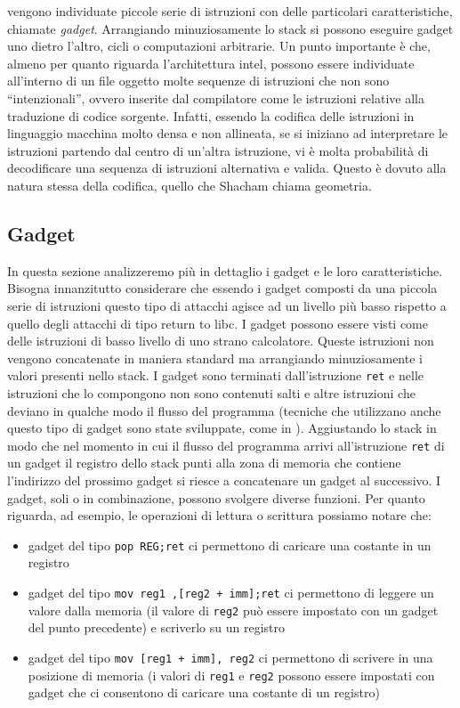 vengono individuate piccole serie di istruzioni con delle particolari
caratteristiche, chiamate \emph{gadget}. Arrangiando minuziosamente lo
stack si possono eseguire gadget uno dietro l'altro, cicli o
computazioni arbitrarie. Un punto importante è che, almeno per quanto
riguarda l'architettura intel, possono essere individuate all'interno
di un file oggetto molte sequenze di istruzioni che non sono
``intenzionali'', ovvero inserite dal compilatore come le istruzioni
relative alla traduzione di codice sorgente. Infatti, essendo la
codifica delle istruzioni in linguaggio macchina molto densa e non
allineata, se si iniziano ad interpretare le istruzioni partendo dal
centro di un'altra istruzione, vi è molta probabilità di decodificare
una sequenza di istruzioni alternativa e valida. Questo è dovuto alla
natura stessa della codifica, quello che Shacham chiama geometria.

\subsection{Gadget}

In questa sezione analizzeremo più in dettaglio i gadget e le loro
caratteristiche. Bisogna innanzitutto considerare che essendo i gadget
composti da una piccola serie di istruzioni questo tipo di attacchi
agisce ad un livello più basso rispetto a quello degli attacchi di
tipo return to libc. I gadget possono essere visti come delle
istruzioni di basso livello di uno strano calcolatore. Queste
istruzioni non vengono concatenate in maniera standard ma arrangiando
minuziosamente i valori presenti nello stack. I gadget sono terminati
dall'istruzione \lstinline{ret} e nelle istruzioni che lo compongono
non sono contenuti salti e altre istruzioni che deviano in qualche
modo il flusso del programma (tecniche che utilizzano anche questo
tipo di gadget sono state sviluppate, come in
\cite{Checkoway-10}). Aggiustando lo stack in modo che nel momento in
cui il flusso del programma arrivi all'istruzione \lstinline{ret} di
un gadget il registro dello stack punti alla zona di memoria che
contiene l'indirizzo del prossimo gadget si riesce a concatenare un
gadget al successivo. I gadget, soli o in combinazione, possono
svolgere diverse funzioni. Per quanto riguarda, ad esempio, le
operazioni di lettura o scrittura possiamo notare che:

\begin{itemize}
\item gadget del tipo \lstinline{pop REG;ret} ci permettono di
caricare una costante in un registro

\item gadget del tipo \lstinline{mov reg1 ,[reg2 + imm];ret} ci
  permettono di leggere un valore dalla memoria (il valore di
  \lstinline{reg2} può essere impostato con un gadget del punto
  precedente) e scriverlo su un registro

\item gadget del tipo \lstinline{mov [reg1 + imm], reg2} ci permettono
  di scrivere in una posizione di memoria (i valori di
  \lstinline{reg1} e \lstinline{reg2} possono essere impostati con
  gadget che ci consentono di caricare una costante di un registro)
\end{itemize}

